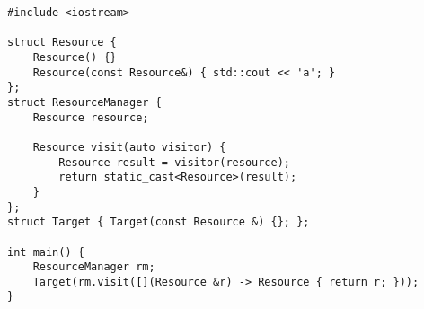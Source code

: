 \begin{lstlisting}[title=\href{https://godbolt.org/z/w96PM3}{\texttt{godbolt.org/z/w96PM3}}]
#include <iostream>

struct Resource {
    Resource() {}
    Resource(const Resource&) { std::cout << 'a'; }
};
struct ResourceManager {
    Resource resource;
 
    Resource visit(auto visitor) {
        Resource result = visitor(resource);
        return static_cast<Resource>(result);
    }
};
struct Target { Target(const Resource &) {}; };

int main() {
    ResourceManager rm;
    Target(rm.visit([](Resource &r) -> Resource { return r; }));
}
\end{lstlisting}
